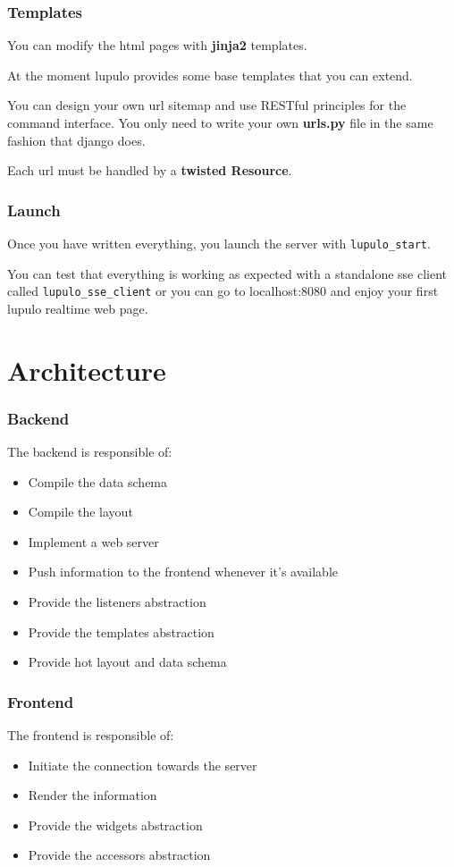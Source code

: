 \documentclass{beamer}
\begin{document}
    \begin{frame}
        \frametitle{Templates}
        You can modify the html pages with \textbf{jinja2} templates.

        At the moment lupulo provides some base templates that you can extend.

        You can design your own url sitemap and use RESTful principles for the
        command interface. You only need to write your own \textbf{urls.py} file
        in the same fashion that django does.

        Each url must be handled by a \textbf{twisted Resource}.

    \begin{frame}
        \frametitle{Launch}
        Once you have written everything, you launch the server with
        \texttt{lupulo\_start}.

        You can test that everything is working as expected with a standalone
        sse client called \texttt{lupulo\_sse\_client} or you can go to
        localhost:8080 and enjoy your first lupulo realtime web page.
    \end{frame}

    \section{Architecture}
    \begin{frame}
        \frametitle{Backend}
        The backend is responsible of:

        \begin{itemize}
            \item Compile the data schema
            \item Compile the layout
            \item Implement a web server
            \item Push information to the frontend whenever it's available
            \item Provide the listeners abstraction
            \item Provide the templates abstraction
            \item Provide hot layout and data schema
        \end{itemize}
    \end{frame}

    \begin{frame}
        \frametitle{Frontend}
        The frontend is responsible of:

        \begin{itemize}
            \item Initiate the connection towards the server
            \item Render the information
            \item Provide the widgets abstraction
            \item Provide the accessors abstraction
        \end{itemize}
    \end{frame}


\end{frame}
\end{document}
